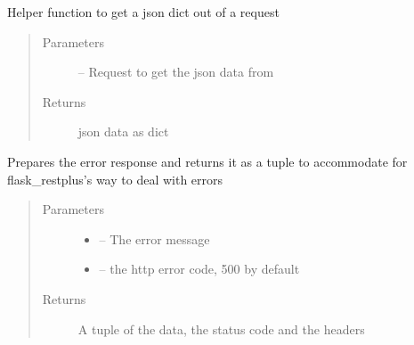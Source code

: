 \documentclass[letterpaper,10pt,english]{sphinxmanual}
\begin{document}
\begin{fulllineitems}
\label{_source/son_editor.util:son_editor.util.requestutil.get_json}
Helper function to get a json dict out of a request
\begin{quote}\begin{description}
\item[{Parameters}] \leavevmode
{} -- Request to get the json data from

\item[{Returns}] \leavevmode
json data as dict

\end{description}\end{quote}

\end{fulllineitems}


\begin{fulllineitems}
\label{_source/son_editor.util:son_editor.util.requestutil.prepare_error}
Prepares the error response and returns it as a tuple
to accommodate for flask\_restplus's way to deal with errors
\begin{quote}\begin{description}
\item[{Parameters}] \leavevmode\begin{itemize}
\item {} 
 -- The error message

\item {} 
 -- the http error code, 500 by default

\end{itemize}

\item[{Returns}] \leavevmode
A tuple of the data, the status code and the headers

\end{description}\end{quote}

\end{fulllineitems}
\end{document}
